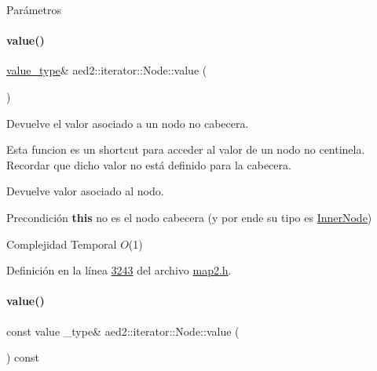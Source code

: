 \begin{DoxyParams}{\-Parámetros}
\paragraph{\texorpdfstring{value()}{value()}\hspace{0.1cm}{\footnotesize\ttfamily [1/2]}}
{\footnotesize\ttfamily \hyperlink{classaed2_1_1iterator_a6411a2c08b2b7c52f063bef1a168acb6_a6411a2c08b2b7c52f063bef1a168acb6}{value\+\_\+type}\& aed2\+::iterator\+::\+Node\+::value (\begin{DoxyParamCaption}{ }\end{DoxyParamCaption})\hspace{0.3cm}{\ttfamily [inline]}}



Devuelve el valor asociado a un nodo no cabecera. 

Esta funcion es un shortcut para acceder al valor de un nodo no centinela. Recordar que dicho valor no está definido para la cabecera.

\begin{DoxyReturn}{Devuelve}
valor asociado al nodo.
\end{DoxyReturn}
\begin{DoxyPrecond}{Precondición}
{\bfseries this} no es el nodo cabecera (y por ende su tipo es \hyperlink{structaed2_1_1iterator_1_1InnerNode}{Inner\+Node})
\end{DoxyPrecond}

\begin{DoxyDescription}
\item[Complejidad Temporal]$O$(1)
\end{DoxyDescription}

Definición en la línea \hyperlink{map2_8h_source_l03243}{3243} del archivo \hyperlink{map2_8h_source}{map2.\+h}.

\mbox{\label{structaed2_1_1iterator_1_1Node_ad96bf1d32de8726678dd95c687f7ee36_ad96bf1d32de8726678dd95c687f7ee36}} 
\paragraph{\texorpdfstring{value()}{value()}\hspace{0.1cm}{\footnotesize\ttfamily [2/2]}}
{\footnotesize\ttfamily const value \+\_\+type\& aed2\+::iterator\+::\+Node\+::value (\begin{DoxyParamCaption}{ }\end{DoxyParamCaption}) const\hspace{0.3cm}{\ttfamily [inline]}}


\end{DoxyParams}
